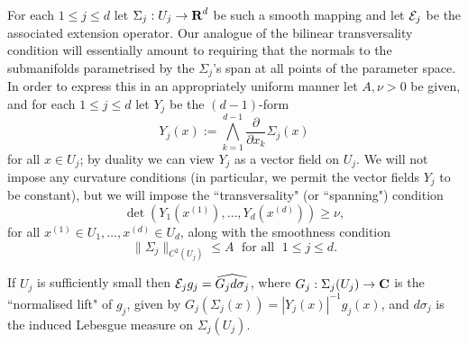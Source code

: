 For each $1\leq j\leq d$ let $\Sigma_{j}:U_{j}\rightarrow {\hbox{\bf R}}^{d}$
be such a smooth mapping and let ${\mathcal{E}}_j$ be the associated
extension operator. Our analogue of the bilinear transversality
condition will essentially amount to requiring that the normals to
the submanifolds parametrised by the $\Sigma_{j}$'s span at all
points of the parameter space. In order to express this in an
appropriately uniform manner let $A,\nu>0$ be given, and for each
$1\leq j\leq d$ let $Y_j$ be the $(d-1)$-form
$$
Y_{j}(x):=\bigwedge_{k=1}^{d-1}\frac{\partial}{\partial
x_{k}}\Sigma_{j}(x)
$$
for all $x \in U_j$; by duality we can view $Y_j$ as a vector field on $U_j$.
We will not impose any curvature conditions (in particular, we permit the vector fields
$Y_j$ to be constant), but we will impose the ``transversality" (or ``spanning") condition
\begin{equation}\label{spanning}
\det\left(Y_{1}(x^{(1)}),\hdots,Y_{d}(x^{(d)})\right)\geq\nu,
\end{equation}
for all $x^{(1)}\in U_{1},\hdots,x^{(d)}\in U_d$, along with the
smoothness condition
\begin{equation}\label{smoothcond}
\|\Sigma_{j}\|_{C^{2}(U_j)}\leq A\;\mbox{ for all }\;1\leq j\leq d.
\end{equation}

\begin{remark}\label{alt}
If $U_j$ is sufficiently small then
${\mathcal{E}}_{j}g_{j}=\widehat{G_{j}d\sigma_{j}}$, where
$G_{j}:\Sigma_{j}(U_{j})\rightarrow{\hbox{\bf C}}$ is the ``normalised lift"
of $g_{j}$, given by
$G_{j}(\Sigma_{j}(x))=|Y_{j}(x)|^{-1}g_{j}(x)$, and $d\sigma_{j}$
is the induced Lebesgue measure on $\Sigma_{j}(U_{j})$.
\end{remark}

